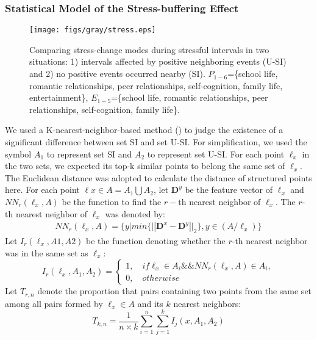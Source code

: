 \documentclass[5p,times,numbers,authoryear]{elsarticle}
\begin{document}
\subsubsection{Statistical Model of the Stress-buffering Effect}
\begin{figure*}
\centering
\texttt{[image: figs/gray/stress.eps]}
\caption{\small{Comparing stress-change modes during stressful intervals in two situations:
1) intervals affected by positive neighboring events (U-SI) and 2) no positive events occurred nearby (SI).
$P_{1-6}$=\{school life, romantic relationships, peer relationships, self-cognition, family life, entertainment\},
$E_{1-5}$=\{school life, romantic relationships, peer relationships, self-cognition, family life\}.}}
\label{fig:stress}
\end{figure*}
We used a K-nearest-neighbor-based method (\cite{Schilling1986Multivariate}) to judge the existence of a significant difference between set SI and set U-SI.
For simplification, we used the symbol $A_1$ to represent set SI and $A_2$ to represent set U-SI.
For each point $\ell_{x}$ in the two sets, we expected its top-k similar points to belong the same set of $\ell_x$.
The Euclidean distance was adopted to calculate the distance of structured points here.
For each point $\ell x \in A=A_1\bigcup A_2$, let $\textbf{D}^y$ be the feature vector of $\ell_x$ and $NN_r(\ell_x,A)$ be the function to find the $r-$th nearest neighbor of $\ell_x$.
The $r$-th nearest neighbor of $\ell_x$ was denoted by:
\begin{equation}
\begin{aligned}
& NN_r(\ell_x,A) = \{y | min\{||\textbf{D}^x-\textbf{D}^y ||_2\}, y\in(A/\ell_x)\} &
\end{aligned}
\end{equation}
Let $I_r(\ell_x,A1,A2)$ be the function denoting whether the $r$-th nearest neighbor was in the same set as $\ell_x$:
\begin{equation}
I_r(\ell_x,A_1,A_2) =
\left\{ \begin{array}{ll}
1, \quad if \ell_x \in A_i  \&\& NN_r(\ell_x,A)\in A_i,\\
0, \quad otherwise
\end{array}
\right.
\end{equation}
Let $T_{r,n}$ denote the proportion that pairs containing two points from the same set among all pairs formed by $\ell_x \in A$ and its $k$ nearest neighbors:
\begin{equation}
T_{k,n}= \frac{1}{n\times k}\sum_{i=1}^{n}\sum_{j=1}^{k}I_j(x,A_1,A_2)
\end{equation}
\end{document}
